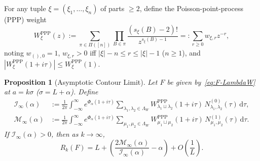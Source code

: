 \documentclass[11pt, reqno]{amsart}
\newtheorem{proposition}[lemma]{Proposition}
\theoremstyle{remark}
\numberwithin{equation}{section}
\newcommand{\dd}{\,\mathrm{d}}
\begin{document}
For any tuple $\xi = (\xi_1,\dots,\xi_n)$ of parts $\ge 2$, define the Poisson-point-process (PPP) weight
\begin{equation}\label{eq:WPPP-def}
W_\xi^{\mathrm{PPP}}(z) := \sum_{\pi \in \Pi([n])} \prod_{B \in \pi}
\frac{(s_\xi(B)-2)!}{z^{s_\xi(B)-1}} =: \sum_{r \ge 0} w_{\xi, r} z^{-r},
\end{equation}
noting $w_{(),0} = 1$, $w_{\xi, r} > 0$ iff $|\xi| - n \le r \le |\xi| - 1$ ($n \ge 1$), and
$|W_\xi^{\mathrm{PPP}}(1+i\tau)| \le W_\xi^{\mathrm{PPP}}(1)$.

\begin{proposition}[Asymptotic Contour Limit]\label{prop:contour-limit}
Let $F$ be given by~\eqref{eq:F-LambdaW} at $a = k\sigma$ ($\sigma = L+\alpha$). Define
\begin{align}
\mathcal{I}_\infty(\alpha) &:= \frac{1}{2\pi}\int_{-\infty}^\infty e^{\Phi_\alpha(1+i\tau)}
\sum_{\lambda_1,\lambda_2 \in \Lambda_W} W_{\lambda_1\sqcup\lambda_2}^{\mathrm{PPP}}(1+i\tau)\, N_{\lambda_1,\lambda_2}^{(0)}(\tau)\dd\tau, \label{eq:I-inf-def}\\
\mathcal{M}_\infty(\alpha) &:= \frac{1}{2\pi}\int_{-\infty}^\infty e^{\Phi_\alpha(1+i\tau)}
\sum_{\mu_1,\mu_2 \in \Lambda_W} W_{\mu_1\sqcup\mu_2}^{\mathrm{PPP}}(1+i\tau)\, N_{\mu_1,\mu_2}^{(1)}(\tau)\dd\tau. \label{eq:M-inf-def}
\end{align}
If $\mathcal{I}_\infty(\alpha) > 0$, then as $k \to \infty$,
\begin{equation}\label{eq:quotient-limit}
R_k(F) = L + \left(\frac{2\mathcal{M}_\infty(\alpha)}{\mathcal{I}_\infty(\alpha)} - \alpha\right) + O\!\left(\frac{1}{L}\right).
\end{equation}
\end{proposition}
\end{document}
